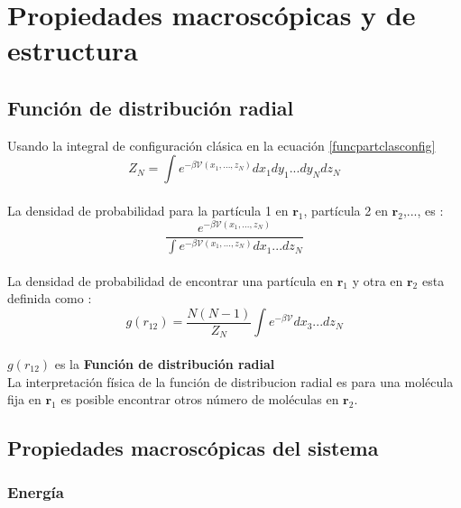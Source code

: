 \chapter{Propiedades macroscópicas y de estructura}
\section{Función de distribución radial}
Usando la integral de configuración clásica en la ecuación \ref{funcpartclasconfig}\\

\begin{equation} \label{intconfclas}
    Z_N = \int e^{-\beta \mathcal{V}(x_1,...,z_N)}dx_1dy_1...dy_N dz_N
\end{equation}\\

La densidad de probabilidad para la partícula 1 en $\mathbf{r}_1$, partícula 2 en $\mathbf{r}_2$,..., es \cite{feynman1972statistical}:\\

\begin{equation}
    \frac{e^{-\beta \mathcal{V}(x_1,...,z_N)}}{\int e^{-\beta \mathcal{V}(x_1,...,z_N)}dx_1...dz_N}
\end{equation}\\

La densidad de probabilidad de encontrar una partícula en $\mathbf{r}_1$ y otra en $\mathbf{r}_2$ esta definida como \cite{feynman1972statistical}:\\

\begin{equation}
    g(r_{12}) = \frac{N(N-1)}{Z_N}
    \int e^{-\beta\mathcal{V}}dx_3...dz_N
\end{equation}\\

$g(r_{12})$ es la \textbf{Función de distribución radial}\\

La interpretación física de la función de distribucion radial es para una molécula fija en $\mathbf{r}_1$ es posible encontrar otros número de moléculas en $\mathbf{r}_2$.

\section{Propiedades macroscópicas del sistema}

\subsection{Energía}

